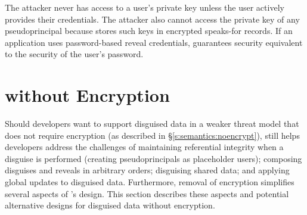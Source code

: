 %
%
The attacker never has access to a user's private key unless the user actively
provides their credentials.
%
The attacker also cannot access the private key of any pseudoprincipal because
\sys stores such keys in encrypted speaks-for records.
%
%
If an application uses password-based reveal credentials, \sys
guarantees security equivalent to the security of the user's password.

\section{\sys without Encryption}
\label{s:noencrypt}

%

Should developers want to support disguised data in a weaker threat model that
does not require encryption (as described in \S\ref{s:semantics:noencrypt}),
\sys still helps developers address the challenges of maintaining referential
integrity when a disguise is performed (creating pseudoprincipals as placeholder
users); composing disguises and reveals in arbitrary orders; disguising shared
data; and applying global updates to disguised data.
%
Furthermore, removal of encryption simplifies several aspects of \sys's design.
%
This section
describes these aspects and potential
alternative designs for disguised data without encryption. 

